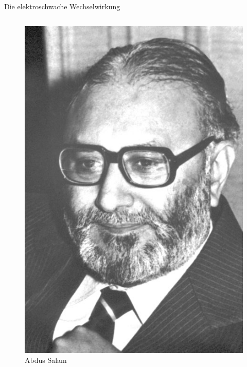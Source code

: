 \documentclass[aspectratio=1610, professionalfonts, 10pt]{beamer}
\begin{document}
\begin{frame}{Die elektroschwache Wechselwirkung}
\begin{columns}
\begin{figure}
				\includegraphics[width=\linewidth]{Images/salam-13319-portrait-mini-2x.jpg}
	  			\caption{Abdus Salam}
	  			\label{fig:fermi}
			\end{figure}
	\end{columns}
	\cite{9789810207274}
\end{frame}
\end{document}
